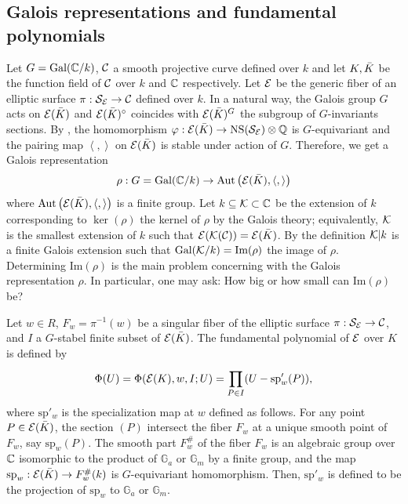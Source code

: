 \documentclass[11pt]{amsart}
\begin{document}
\subsection{Galois representations and fundamental polynomials}
Let $G=\text{Gal}({\mathbb C}/k)$, ${\mathcal C}$ a smooth projective curve  defined over $k$ and  let $K, {{\bar K}}$ be the function field of ${\mathcal C}$ over $k$ and ${\mathbb C}$ respectively.
Let   ${\mathcal E}$ be the generic fiber of an elliptic surface $\pi: {\mathcal S}_{{\mathcal E}} \rightarrow {\mathcal C}$ defined over $k$. In a natural way, the Galois group $G$
acts on ${\mathcal E}({{\bar K}})$ and ${\mathcal E}({{\bar K}})^\circ $  coincides with ${\mathcal E}({{\bar K}})^G$ the subgroup of $G$-invariants sections.
By  \cite[proposition 8.13]{Shioda1992a},  the homomorphism    $\varphi: {\mathcal E}({{\bar K}}) \rightarrow {\rm NS} ({\mathcal S}_{\mathcal E}) \otimes {\mathbb Q}$ is
$G$-equivariant and the pairing map $\left\langle , \right\rangle $ on ${\mathcal E}({{\bar K}})$ is stable under action of $G$.
Therefore, we get a Galois representation $$\rho: G =\text{Gal}({\mathbb C}/k) \rightarrow {\text{Aut}}\left(  {\mathcal E}({{\bar K}}), \left\langle , \right\rangle \right)  $$
where ${\text{Aut}}\left(  {\mathcal E}({{\bar K}}), \left\langle , \right\rangle \right)  $ is a finite group.
Let $k \subseteq {\mathcal K} \subset {\mathbb C} $ be  the extension of $k$ corresponding to  
$\ker(\rho)$  the kernel of $\rho$ by the Galois theory; 
equivalently, ${\mathcal K}$ is the smallest extension of $k$ such that  ${\mathcal E}({\mathcal K}({\mathcal C}))={\mathcal E}({{\bar K}})$.
By the definition ${\mathcal K}|k$ is a finite Galois extension such that $\text{Gal}({\mathcal K}/k) =\text{Im}(\rho)$ the image of $\rho.$ 
Determining  $\text{Im}(\rho)$ is
the main problem concerning  with the Galois representation $\rho$. In particular, one may ask:  How big or how small can $\text{Im}(\rho)$ be?



Let $w\in R$, $F_w=\pi^{-1}(w)$ be a singular fiber of the elliptic surface $\pi: {\mathcal S}_{{\mathcal E}} \rightarrow {\mathcal C}$, and
$I$ a $G$-stabel finite subset of ${\mathcal E}({{\bar K}})$. The {\sf fundamental polynomial} of ${\mathcal E}$ over $K$ is defined by
$$\Phi(U)= \Phi({\mathcal E}(K), w, I;U)=\prod_{P\in I}^{} (U-\text{sp}'_w(P)),$$
where $\text{sp}'_w$ is the {\sf specialization map} at $w$ defined as follows.
For any point $P\in {\mathcal E}({{\bar K}})$, the section $(P)$ intersect the fiber $F_w$ at a unique smooth point of $F_w$, say $\text{sp}_w(P)$.
The smooth part $F_w^{\#}$ of the fiber $F_w$ is an algebraic group over ${\mathbb C}$ 
isomorphic to the product of ${\mathbb G}_a$ or ${\mathbb G}_m$ by a finite group, and 
the map $\text{sp}_w:  {\mathcal E}({{\bar K}}) \rightarrow F_w^{\#}(k)$ is $G$-equivariant homomorphism. Then, $\text{sp}'_w$ is defined to be the projection of 
$\text{sp}_w$ to  ${\mathbb G}_a$ or ${\mathbb G}_m$. 
\end{document}
